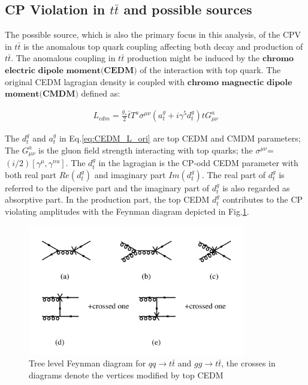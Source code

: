 	\subsection{CP Violation in $t\bar{t}$ and possible sources}
	\label{ssec:Intro_CPVpossible}

		The possible source, which is also the primary focus in this analysis, of the CPV in $t\bar{t}$ is the anomalous top quark coupling affecting both decay and production of $t\bar{t}$. The anomalous coupling in $t\bar{t}$ production might be induced by the $\textbf{chromo}$ $\textbf{electric}$ $\textbf{dipole moment(CEDM)}$ of the interaction with top quark. The original CEDM lagragian density is coupled with $\textbf{chromo}$ $\textbf{magnectic}$ $\textbf{dipole}$ $\textbf{moment(CMDM)}$ defined as:

		\begin{equation}
		\begin{split}
		L_{cdm} = \frac{g_s}{2} \bar{t} T^a\sigma^{\mu \nu}(a_t^g + i \gamma^5 d_t^g) t G^a_{\mu \nu}
		\label{eq:CEDM_L_ori}
		\end{split}
		\end{equation}
		\FloatBarrier

		The $d_t^g$ and $a_t^g$ in Eq.\ref{eq:CEDM_L_ori} are top CEDM and CMDM parameters; The $G^a_{\mu \nu}$ is the gluon field strength interacting with top quarks; the $\sigma^{\mu \nu}$=$(i/2) [\gamma^{\mu},\gamma^{nu}]$.
		The $d_t^g$ in the lagragian is the CP-odd CEDM parameter with both real part $Re(d_t^g)$ and imaginary part $Im(d_t^g)$. \cite{Zhou:1998wz} The real part of $d_t^g$ is referred to the dipersive part and the imaginary part of $d_t^g$ is also regarded as absorptive part. In the production part, the top CEDM $d_t^g$ contributes to the CP violating amplitudes with the Feynman diagram depicted in Fig.\ref{Intro:fig:qqgg_tt}.

		\begin{figure}[H]
		\centering
			\includegraphics[width=0.85\textwidth]{Figures/Intro/qqgg_tt.png}
		\caption{Tree level Feynman diagram for $qq \rightarrow t\bar{t}$ and $gg \rightarrow t\bar{t}$, the crosses in diagrams denote the vertices modified by top CEDM \cite{Zhou:1998wz}}
		\label{Intro:fig:qqgg_tt}
		\end{figure}
		\FloatBarrier

